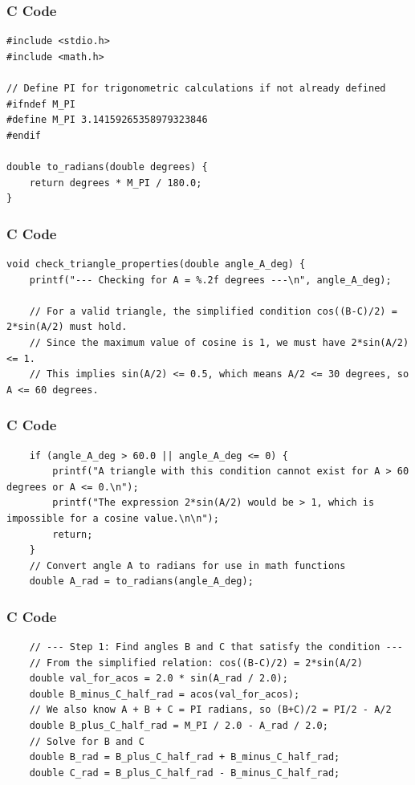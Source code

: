 \documentclass{beamer}
\begin{document}
\begin{frame}[fragile]
\frametitle{C Code}
\begin{lstlisting}
#include <stdio.h>
#include <math.h>

// Define PI for trigonometric calculations if not already defined
#ifndef M_PI
#define M_PI 3.14159265358979323846
#endif

double to_radians(double degrees) {
    return degrees * M_PI / 180.0;
}
\end{lstlisting}
\end{frame}

\begin{frame}[fragile]
\frametitle{C Code}
\begin{lstlisting}
void check_triangle_properties(double angle_A_deg) {
    printf("--- Checking for A = %.2f degrees ---\n", angle_A_deg);

    // For a valid triangle, the simplified condition cos((B-C)/2) = 2*sin(A/2) must hold.
    // Since the maximum value of cosine is 1, we must have 2*sin(A/2) <= 1.
    // This implies sin(A/2) <= 0.5, which means A/2 <= 30 degrees, so A <= 60 degrees.
\end{lstlisting}
\end{frame}

\begin{frame}[fragile]
\frametitle{C Code}
\begin{lstlisting}
    if (angle_A_deg > 60.0 || angle_A_deg <= 0) {
        printf("A triangle with this condition cannot exist for A > 60 degrees or A <= 0.\n");
        printf("The expression 2*sin(A/2) would be > 1, which is impossible for a cosine value.\n\n");
        return;
    }
    // Convert angle A to radians for use in math functions
    double A_rad = to_radians(angle_A_deg);
\end{lstlisting}
\end{frame}

\begin{frame}[fragile]
\frametitle{C Code}
\begin{lstlisting}
    // --- Step 1: Find angles B and C that satisfy the condition ---
    // From the simplified relation: cos((B-C)/2) = 2*sin(A/2)
    double val_for_acos = 2.0 * sin(A_rad / 2.0);
    double B_minus_C_half_rad = acos(val_for_acos);   
    // We also know A + B + C = PI radians, so (B+C)/2 = PI/2 - A/2
    double B_plus_C_half_rad = M_PI / 2.0 - A_rad / 2.0;
    // Solve for B and C
    double B_rad = B_plus_C_half_rad + B_minus_C_half_rad;
    double C_rad = B_plus_C_half_rad - B_minus_C_half_rad;
\end{lstlisting}
\end{frame}
\end{document}
